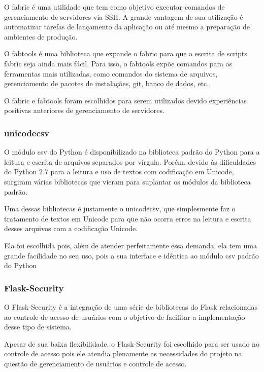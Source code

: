 \documentclass[
	article,			%
	11pt,				%
	oneside,			%
	a4paper,			%
	english,			%
	brazil,				%
	sumario=tradicional
	]{abntex2}
\begin{document}
O fabric é uma utilidade que tem como objetivo executar comandos de gerenciamento de servidores via SSH.
A grande vantagem de sua utilização é automatizar tarefas de lançamento da aplicação ou até mesmo a preparação de ambientes de produção.\cite{fabric}

O fabtools é uma biblioteca que expande o fabric para que a escrita de scripts fabric seja ainda mais fácil.
Para isso, o fabtools expõe comandos para as ferramentas mais utilizadas, como comandos do sistema de arquivos, gerenciamento de pacotes de instalações, git, banco de dados, etc.. \cite{fabtools}

O fabric e fabtools foram escolhidos para serem utilizados devido experiências positivas anteriores de gerenciamento de servidores.

\subsubsection{unicodecsv}

O módulo csv do Python é disponibilizado na biblioteca padrão do Python para a leitura e escrita de arquivos separados por vírgula.
Porém, devido às dificuldades do Python 2.7 para a leitura e uso de textos com codificação em Unicode, surgiram várias bibliotecas que vieram para suplantar os módulos da biblioteca padrão.

Uma dessas bibliotecas é justamente o unicodecsv, que simplesmente faz o tratamento de textos em Unicode para que não ocorra erros na leitura e escrita desses arquivos com a codificação Unicode. \cite{unicodecsv}

Ela foi escolhida pois, além de atender perfeitamente essa demanda, ela tem uma grande facilidade no seu uso, pois a sua interface e idêntica ao módulo csv padrão do Python

\subsubsection{Flask-Security}

O Flask-Security é a integração de uma série de bibliotecas do Flask relacionadas ao controle de acesso de usuários com o objetivo de facilitar a implementação desse tipo de sistema. \cite{flasksecurity}

Apesar de sua baixa flexibilidade, o Flask-Security foi escolhido para ser usado no controle de acesso pois ele atendia plenamente as necessidades do projeto na questão de gerenciamento de usuários e controle de acesso.
\end{document}
